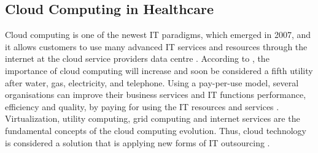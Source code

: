 
\subsection{Cloud Computing in Healthcare}

Cloud computing is one of the newest IT paradigms, which emerged in 2007, and it allows customers to use many advanced IT services and resources through the internet at the cloud service providers data centre \cite{Sultan2014}. According to \citet{Buyya2009}, the importance of cloud computing will increase and soon be considered a fifth utility after water, gas, electricity, and telephone. Using a pay-per-use model, several organisations can improve their business services and IT functions performance, efficiency and quality, by paying for using the IT resources and services \cite{Abdollahzadehgan2013}. Virtualization, utility computing, grid computing and internet services are the fundamental concepts of the cloud computing evolution. Thus, cloud technology is considered a solution that is applying new forms of IT outsourcing \cite{tashkandi2015cloud,Chang2013}.

